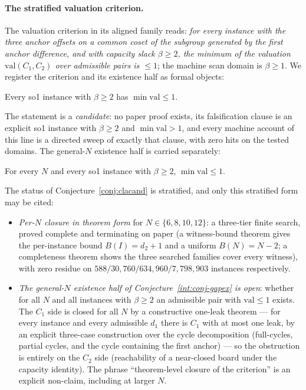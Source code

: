 \paragraph{The stratified valuation criterion.}
The valuation criterion in its aligned family reads: \emph{for every
instance with the three anchor offsets on a common coset of the
subgroup generated by the first anchor difference, and with capacity slack
$\beta\ge2$, the minimum of the valuation $\mathrm{val}(C_1,C_2)$ over
admissible pairs is $\le1$}; the machine scan domain is $\beta\ge1$. We
register the criterion and its existence half as formal objects:
\begin{conjecture}\label{conj:clacand}
Every so1 instance with $\beta\ge2$ has $\min\mathrm{val}\le1$.
\end{conjecture}
The statement is a \emph{candidate}: no paper proof exists, its
falsification clause is an explicit so1 instance with $\beta\ge2$ and
$\min\mathrm{val}>1$, and every machine account of this line is a directed
sweep of exactly that clause, with zero hits on the tested domains. The
general-$N$ existence half is carried separately:
\begin{conjecture}\label{int:conj-gapex}
For every $N$ and every so1 instance with $\beta\ge2$,
$\min\mathrm{val}\le1$.
\end{conjecture}
The status of Conjecture~\ref{conj:clacand} is stratified, and only this
stratified form may be cited:
\begin{itemize}[leftmargin=1.5em]
\item \emph{Per-$N$ closure in theorem form} for $N\in\{6,8,10,12\}$: a
three-tier finite search, proved complete and terminating on paper (a
witness-bound theorem gives the per-instance bound $B(I)=d_2+1$ and a
uniform $B(N)=N-2$; a completeness theorem shows the three searched
families cover every witness), with zero residue on
$588/30{,}760/634{,}960/7{,}798{,}903$ instances respectively.
\item \emph{The general-$N$ existence half of
Conjecture~\ref{int:conj-gapex} is open}: whether for all $N$
and all instances with $\beta\ge2$ an admissible pair with
$\mathrm{val}\le1$ exists. The $C_1$ side is closed for all $N$ by a
constructive one-leak theorem --- for every instance and every admissible
$d_1$ there is $C_1$ with at most one leak, by an explicit three-case
construction over the cycle decomposition (full-cycles, partial cycles,
and the cycle containing the first anchor) --- so the obstruction is
entirely on the $C_2$ side (reachability of a near-closed board under the
capacity identity). The phrase ``theorem-level closure of the criterion''
is an explicit non-claim, including at larger $N$.
\end{itemize}

